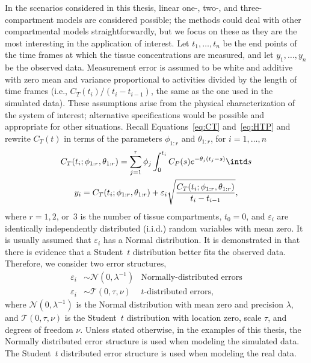 In the scenarios considered in this thesis, linear one-, two-, and
three-compartment models are considered possible; the methods could deal with
other compartmental models straightforwardly, but we focus on these as they
are the most interesting in the application of interest. Let $t_1, \dots,
t_n$ be the end points of the time frames at which the tissue concentrations
are measured, and let $y_1,\dots,y_n$ be the observed data. Measurement error
is assumed to be white and additive with zero mean and variance proportional
to activities divided by the length of time frames (i.e., $C_T(t_i)/(t_i -
t_{i-1})$, the same as the one used in the simulated data). These assumptions
arise from the physical characterization of the \pet system of interest;
alternative specifications would be possible and appropriate for other
situations. Recall Equations~\eqref{eq:CT} and~\eqref{eq:HTP} and rewrite
$C_T(t)$ in terms of the parameters $\phi_{1:r}$ and $\theta_{1:r}$, for $i =
1,\dots,n$
\begin{gather*}
  C_T(t_i;\phi_{1:r},\theta_{1:r}) =
  \sum_{j=1}^r \phi_j\int_0^{t_i}C_P(s)e^{-\theta_j(t_j-s)} \intd s \\
  y_i = C_T(t_i;\phi_{1:r},\theta_{1:r}) +
  \varepsilon_i\sqrt{\frac{C_T(t_i;\phi_{1:r},\theta_{1:r})} {t_i - t_{i-1}}},
\end{gather*}
where $r = 1, 2$, or~$3$ is the number of tissue compartments, $t_0 = 0$, and
$\varepsilon_i$ are identically independently distributed (i.i.d.) random
variables with mean zero. It is usually assumed that $\varepsilon_i$ has a
Normal distribution. It is demonstrated in \cite{Zhou2013} that there is
evidence that a Student~$t$ distribution better fits the observed data.
Therefore, we consider two error structures,
\begin{align*}
  \varepsilon_i &\sim \mathcal{N}(0,\lambda^{-1})
  &\text{Normally-distributed errors} \\
  \varepsilon_i &\sim \mathcal{T}(0,\tau,\nu)
  &\text{$t$-distributed errors},
\end{align*}
where $\mathcal{N}(0,\lambda^{-1})$ is the Normal distribution with mean zero
and precision $\lambda$, and $\mathcal{T}(0,\tau,\nu)$ is the Student~$t$
distribution with location zero, scale $\tau$, and degrees of freedom $\nu$.
Unless stated otherwise, in the examples of this thesis, the Normally
distributed error structure is used when modeling the simulated data. The
Student~$t$ distributed error structure is used when modeling the real data.
